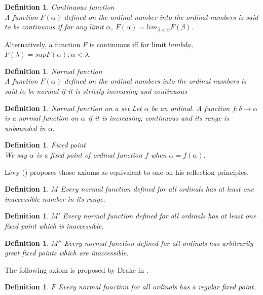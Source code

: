 \documentclass[12pt,a4paper]{article}
\newtheorem{definition}[theorem]{Definition}
\newcommand{\then}{\rightarrow}
\begin{document}
\begin{definition}{Continuous function}\\
A function $F(\alpha)$ defined on the ordinal number into the ordinal numbers is said to be \emph{continuous} if
for any limit $\alpha$, $F(\alpha) = lim_{\beta < \alpha} F(\beta)$.
\end{definition}
Alternatively, a function $F$ is continuous iff for limit $lambda$, $F(\lambda) = sup {F(\alpha) : \alpha < \lambda}$.

\begin{definition}{Normal function}\label{def:normal_function}\\
A function $F(\alpha)$ defined on the ordinal numbers into the ordinal numbers is said to be \emph{normal} if it is \emph{strictly increasing} and \emph{continuous}
\end{definition}

\begin{definition}{Normal function on a set}
Let $\alpha$ be an ordinal. A function $f: \delta \then \alpha$ is a normal function on $\alpha$ if it is increasing, continuous and its range is unbounded in $\alpha$.
\end{definition}

\begin{definition}{Fixed point}\\
We say $\alpha$ is a fixed point of ordinal function $f$ when $\alpha=f(\alpha)$.
\end{definition}


Lévy (\cite{Levy60a}) proposes those axioms as equivalent to one on his reflection principles. 
\begin{definition}{$M$}
Every normal function defined for all ordinals has at least one inaccessible number in its range.
\end{definition}

\begin{definition}{$M'$}
Every normal function defined for all ordinals has at least one fixed point which is inaccessible.
\end{definition}

\begin{definition}{$M''$}
Every normal function defined for all ordinals has arbitrarily great fixed points which are inaccessible.
\end{definition}

The following axiom is proposed by Drake in \cite{DrakeBook}. 
\begin{definition}{$F$}
Every normal function for all ordinals has a regular fixed point.
\end{definition}
\end{document}
